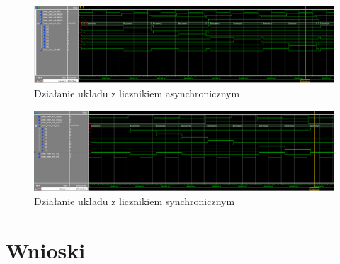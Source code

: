 \documentclass[wide,a4paper,titlepage,12pt] {article}
\begin{document}
\newpage
\begin{landscape}

  \begin{figure}[htbp]
    \begin{center}
      \includegraphics[scale=0.3]{ukl_asynch.png}
      \caption{Działanie układu z licznikiem asynchronicznym}
    \end{center}
  \end{figure}


  \begin{figure}[htbp]
    \begin{center}
      \includegraphics[scale=0.3]{ukl_synch.png}
      \caption{Działanie układu z licznikiem synchronicznym}
    \end{center}
  \end{figure}
\end{landscape}
\newpage

  \section{Wnioski}
\end{document}
